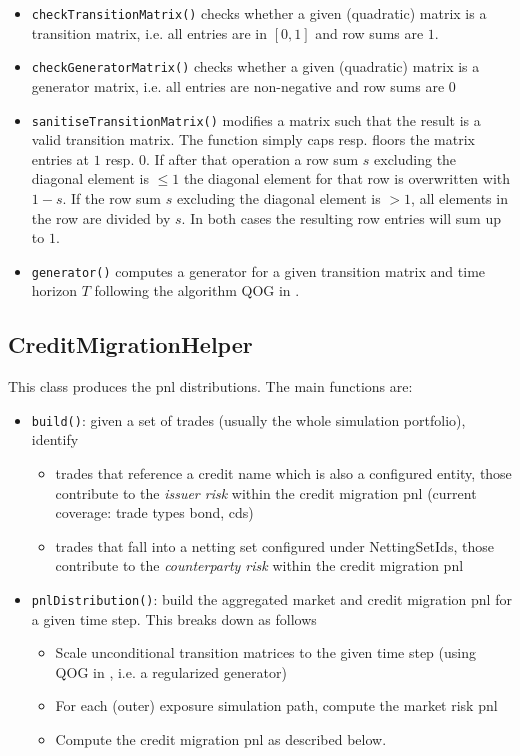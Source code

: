 \documentclass[12pt, a4paper]{article}
\begin{document}
\begin{itemize}
\item \verb+checkTransitionMatrix()+ checks whether a given (quadratic) matrix is a transition matrix, i.e. all entries are in $[0,1]$ and row sums are $1$.
\item \verb+checkGeneratorMatrix()+ checks whether a given (quadratic) matrix is a generator matrix, i.e. all entries
  are non-negative and row sums are $0$
\item \verb+sanitiseTransitionMatrix()+ modifies a matrix such that the result is a valid transition matrix. The function simply caps resp. floors the matrix entries at $1$ resp. $0$. If after that
  operation a row sum $s$ excluding the diagonal element is $\leq 1$ the diagonal element for that row is overwritten
  with $1-s$. If the row sum $s$ excluding the diagonal element is $>1$, all elements in the row are divided by $s$. In
  both cases the resulting row entries will sum up to $1$.
\item \verb+generator()+ computes a generator for a given transition matrix and time horizon $T$ following the algorithm
  QOG in \cite{Kreinin2001}.
\end{itemize}

\subsection{CreditMigrationHelper}

This class produces the pnl distributions. The main functions are:

\begin{itemize}
\item \verb+build()+: given a set of trades (usually the whole simulation portfolio), identify
  \begin{itemize}
    \item trades that reference a credit name which is also a configured entity, those contribute to the {\em issuer
      risk} within the credit migration pnl (current coverage: trade types bond, cds)
    \item trades that fall into a netting set configured under NettingSetIds, those contribute to the {\em counterparty
      risk} within the credit migration pnl
  \end{itemize}
\item \verb+pnlDistribution()+: build the aggregated market and credit migration pnl for a given time step. This breaks down as follows
  \begin{itemize}
  \item Scale unconditional transition matrices to the given time step (using QOG in \cite{Kreinin2001}, i.e. a regularized generator)
  \item For each (outer) exposure simulation path, compute the market risk pnl
  \item Compute the credit migration pnl as described below.
  \end{itemize}
\end{itemize}
\end{document}
